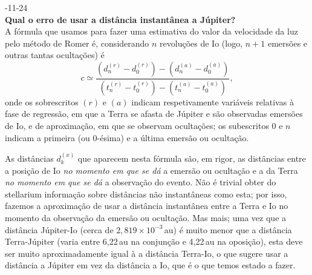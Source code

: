 \documentclass[]{article}
\newcommand{\newlog}[2]{%
  \par
  \vspace{\baselineskip}
  \noindent
  #1\\
  \textbf{#2}\\
}
\begin{document}
\newlog{2024-11-24}{Qual o erro de usar a distância instantânea a Júpiter?}
A fórmula que usamos para fazer uma estimativa do valor da velocidade da luz
pelo método de Romer é, considerando $n$ revoluções de Io (logo, $n+1$ emersões
e outras tantas ocultações) é
\begin{equation*}
  c\simeq\frac{(d^{(r)}_n-d^{(r)}_0)-(d^{(a)}_n-d^{(a)}_0)}%
  {(t^{(r)}_n-t^{(r)}_0)-(t^{(a)}_n-t^{(a)}_0)},
\end{equation*}
onde os sobrescritos $(r)$ e $(a)$ indicam respetivamente variáveis relativas à
fase de regressão, em que a Terra se afasta de Júpiter e são observadas emersões
de Io, e de aproximação, em que se observam ocultações; os subescritos $0$ e $n$
indicam a primeira (ou 0-ésima) e a última emersão ou ocultação.

As distâncias $d^{(x)}_k$ que aparecem nesta fórmula são, em rigor, as
distâncias entre a posição de Io \emph{no momento em que se dá} a emersão ou
ocultação e a da Terra \emph{no momento em que se dá} a observação do evento.
Não é trivial obter do stellarium informação sobre distâncias não instantâneas
como esta; por isso, fazemos a aproximação de usar a distância instantânea entre
a Terra e Io no momento da observação da emersão ou ocultação. Mas mais; uma vez
que a distância Júpiter-Io (cerca de $2,819\times10^{-3}$\,au) é muito menor que
a distância Terra-Júpiter (varia entre 6,22\,au na conjunção e 4,22\,au na
oposição), esta deve ser muito aproximadamente igual à a distância Terra-Io, o
que sugere usar a distância a Júpiter em vez da distância a Io, que é o que
temos estado a fazer.
\end{document}
